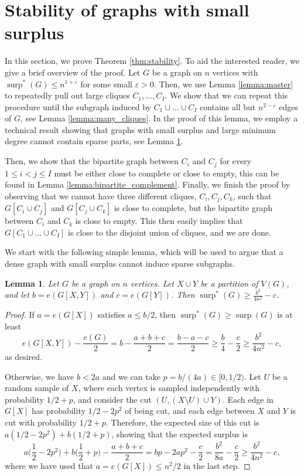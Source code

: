 \documentclass[11pt]{article}
\theoremstyle{plain}
\newtheorem{lemma}[theorem]{Lemma}
\theoremstyle{definition}
\DeclareMathOperator{\surp}{surp}
\newcommand{\eps}{\varepsilon}
\begin{document}
\section{Stability of graphs with small surplus}\label{sect:stability}

In this section, we prove Theorem \ref{thm:stability}. To aid the interested reader, we give a brief overview of the proof. Let $G$ be a graph on $n$ vertices with $\surp^*(G)\leq n^{1+\eps}$ for some small $\eps>0$. Then, we use Lemma \ref{lemma:master} to repeatedly pull out large cliques $C_1,\dots,C_I$. We show that we can repeat this procedure until the subgraph induced by $C_1\cup\dots \cup C_I$ contains all but $n^{2-\eps}$ edges of $G$, see Lemma \ref{lemma:many_cliques}. In the proof of this lemma, we employ a technical result showing that graphs with small surplus and large minimum degree cannot contain sparse parts, see Lemma \ref{lemma:inbalanced_partition}. 

Then, we show that the bipartite graph between $C_i$ and $C_j$ for every $1\leq i<j\leq I$ must be either close to complete or close to empty, this can be found in Lemma \ref{lemma:bipartite_complement}. Finally, we finish the proof by observing that we cannot have three different cliques, $C_i,C_j,C_k$, such that $G[C_i\cup C_j]$ and $G[C_j\cup C_k]$ is close to complete, but the bipartite graph between $C_i$ and $C_k$ is close to empty. This then easily implies that $G[C_1\cup\dots\cup C_I]$ is close to the disjoint union of cliques, and we are done.

We start with the following simple lemma, which will be used to argue that  a dense graph with small surplus cannot induce sparse subgraphs.

\begin{lemma}\label{lemma:inbalanced_partition}
Let $G$ be a graph on $n$ vertices. Let $X\cup Y$ be a partition of $V(G)$, and let $b=e(G[X,Y])$ and $c=e(G[Y])$. Then $\surp^*(G)\geq \frac{b^2}{4n^2}-c$.
\end{lemma}

\begin{proof}
If $a=e(G[X])$ satisfies $a\leq b/2$, then $\surp^*(G) \ge \surp(G)$ is at least $$e(G[X,Y])-\frac{e(G)}{2}=b-\frac{a+b+c}{2}= \frac{b-a-c}{2} \ge \frac{b}{4}-\frac{c}{2}\ge \frac{b^2}{4n^2}-c,$$ as desired.

Otherwise, we have $b < 2a$ and we can take $p=b/(4a) \in [0,1/2)$. Let $U$ be a random sample of $X$, where each vertex is sampled independently with probability $1/2+p$, and consider the cut $(U, (X\setminus U)\cup Y)$. Each edge in $G[X]$ has probability $1/2-2p^2$ of being cut, and each edge between $X$ and $Y$ is cut with probability $1/2+p$. Therefore, the expected size of this cut is $a(1/2-2p^2)+b(1/2+p)$, showing that the expected surplus is 
\[a\Big(\frac{1}{2}-2p^2\Big)+b\Big(\frac{1}{2}+p\Big)-\frac{a+b+c}{2}=bp-2ap^2-\frac{c}{2}=\frac{b^2}{8a}-\frac{c}{2} \ge \frac{b^2}{4n^2}-c,\]
where we have used that $a=e(G[X])\leq n^2/2$ in the last step.
\end{proof}
\end{document}
